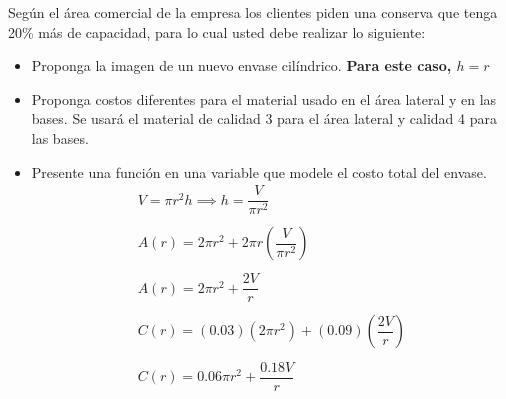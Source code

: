 \documentclass[12pt]{article}
\begin{document}
\noindent Según el área comercial de la empresa los clientes piden una conserva que tenga 20\% más
de capacidad, para lo cual usted debe realizar lo siguiente:
\begin{itemize}
  \item Proponga la imagen de un nuevo envase cilíndrico. \textbf{Para este caso, $h=r$}
  \begin{center}
  \end{center}

  \item Proponga costos diferentes para el material usado en el área lateral y en las bases.
  Se usará el material de calidad 3 para el área lateral y calidad 4 para las bases.

  \item Presente una función en una variable que modele el costo total del envase.
  \[
    \begin{array}{l}
      V = \pi r^2 h \implies h = \dfrac{V}{\pi r^2} \\\\
      A(r) = 2\pi r^2 + 2\pi r\left(\dfrac{V}{\pi r^2}\right) \\\\
      A(r) = 2\pi r^2 + \dfrac{2V}{r} \\\\
      C(r) = (0.03)(2\pi r^2) + (0.09)\left(\dfrac{2V}{r}\right) \\\\
      C(r) = 0.06\pi r^2 + \dfrac{0.18V}{r}
    \end{array}
  \]


\end{itemize}
\end{document}
